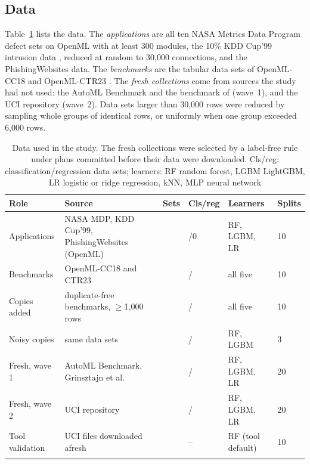 \subsection{Data}
Table~\ref{tab:data} lists the data. The \emph{applications} are all ten NASA Metrics Data Program defect sets on OpenML with at least 300 modules, the 10\% KDD Cup'99 intrusion data \citep{tavallaee2009}, reduced at random to 30,000 connections, and the PhishingWebsites data. The \emph{benchmarks} are the \NNTotal{} tabular data sets of OpenML-CC18 \citep{bischl2021} and OpenML-CTR23 \citep{fischer2023}. The \emph{fresh collections} come from sources the study had not used: the AutoML Benchmark \citep{gijsbers2024} and the benchmark of \citet{grinsztajn2022} (wave~1), and the UCI repository \citep{kelly_uci} (wave~2). Data sets larger than 30,000 rows were reduced by sampling whole groups of identical rows, or uniformly when one group exceeded 6,000 rows.

\begin{table}[!htbp]
\caption{Data used in the study. The fresh collections were selected by a label-free rule under plans committed before their data were downloaded. Cls/reg: classification/regression data sets; learners: RF random forest, LGBM LightGBM, LR logistic or ridge regression, kNN, MLP neural network}\label{tab:data}
\centering\footnotesize
\setlength{\tabcolsep}{3pt}
\begin{tabularx}{\textwidth}{@{}lXrlll@{}}
\toprule
Role & Source & Sets & Cls/reg & Learners & Splits\\
\midrule
Applications & NASA MDP, KDD Cup'99, PhishingWebsites (OpenML) & \NCsNFlagTotal{} & \NCsNFlagTotal{}/0 & RF, LGBM, LR & 10\\
Benchmarks & OpenML-CC18 and CTR23 & \NNTotal{} & \NNCls{}/\NNReg{} & all five & 10\\
Copies added & duplicate-free benchmarks, $\ge$1,000 rows & \NNdN{} & \NInjNDsCla{}/\NInjNDsReg{} & all five & 10\\
Noisy copies & same data sets & \NNdN{} & \NInjNDsCla{}/\NInjNDsReg{} & RF, LGBM & 3\\
Fresh, wave 1 & AutoML Benchmark, Grinsztajn et al. & \NPrN{} & \NPrNCls{}/\NPrNReg{} & RF, LGBM, LR & 20\\
Fresh, wave 2 & UCI repository & \NWTwoN{} & \NWTwoNCls{}/\NWTwoNReg{} & RF, LGBM, LR & 20\\
Tool validation & UCI files downloaded afresh & \NTvN{} & -- & RF (tool default) & 10\\
\botrule
\end{tabularx}
\end{table}

